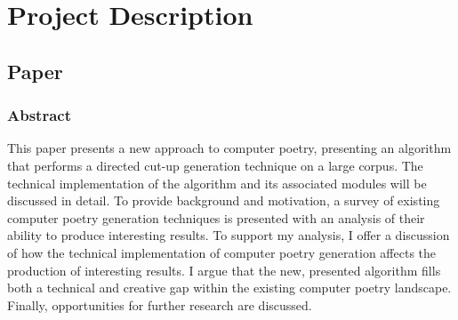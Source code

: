 \documentclass[10pt]{article}
\begin{document}
\section{Project Description} 
\subsection{Paper}
\subsubsection{Abstract}
This paper presents a new approach to computer poetry, presenting an algorithm
that performs a directed cut-up generation technique on a large corpus. The
technical implementation of the algorithm and its associated modules will be
discussed in detail. To provide background and motivation, a survey of existing
computer poetry generation techniques is presented with an analysis of their
ability to produce interesting results. To support my analysis, I offer a
discussion of how the technical implementation of computer poetry generation
affects the production of interesting results. I argue that the new, presented
algorithm fills both a technical and creative gap within the existing computer
poetry landscape. Finally, opportunities for further research are discussed.
\end{document}
